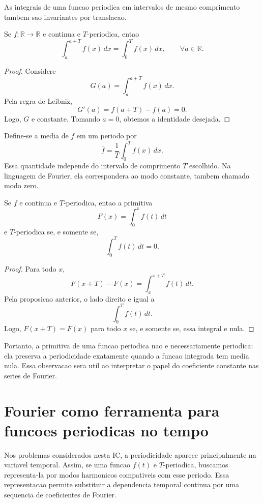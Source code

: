 As integrais de uma funcao periodica em intervalos de mesmo comprimento tambem
sao invariantes por translacao.

\begin{proposicao}
Se \(f:\mathbb{R}\to\mathbb{R}\) e continua e \(T\)-periodica, entao
\[
\int_a^{a+T}f(x)\,dx=\int_0^T f(x)\,dx,
\qquad \forall a\in\mathbb{R}.
\]
\end{proposicao}

\begin{proof}
Considere
\[
G(a)=\int_a^{a+T}f(x)\,dx.
\]
Pela regra de Leibniz,
\[
G'(a)=f(a+T)-f(a)=0.
\]
Logo, \(G\) e constante. Tomando \(a=0\), obtemos a identidade desejada.
\end{proof}

Define-se a media de \(f\) em um periodo por
\[
\overline f=\frac{1}{T}\int_0^T f(x)\,dx.
\]
Essa quantidade independe do intervalo de comprimento \(T\) escolhido. Na
linguagem de Fourier, ela correspondera ao modo constante, tambem chamado modo
zero.

\begin{proposicao}
Se \(f\) e continua e \(T\)-periodica, entao a primitiva
\[
F(x)=\int_0^x f(t)\,dt
\]
e \(T\)-periodica se, e somente se,
\[
\int_0^T f(t)\,dt=0.
\]
\end{proposicao}

\begin{proof}
Para todo \(x\),
\[
F(x+T)-F(x)=\int_x^{x+T}f(t)\,dt.
\]
Pela proposicao anterior, o lado direito e igual a
\[
\int_0^T f(t)\,dt.
\]
Logo, \(F(x+T)=F(x)\) para todo \(x\) se, e somente se, essa integral e nula.
\end{proof}

Portanto, a primitiva de uma funcao periodica nao e necessariamente periodica:
ela preserva a periodicidade exatamente quando a funcao integrada tem media
nula. Essa observacao sera util ao interpretar o papel do coeficiente constante
nas series de Fourier.

\section{Fourier como ferramenta para funcoes periodicas no tempo}

Nos problemas considerados nesta IC, a periodicidade aparece principalmente na
variavel temporal. Assim, se uma funcao \(f(t)\) e \(T\)-periodica, buscamos
representa-la por modos harmonicos compativeis com esse periodo. Essa
representacao permite substituir a dependencia temporal continua por uma
sequencia de coeficientes de Fourier.

